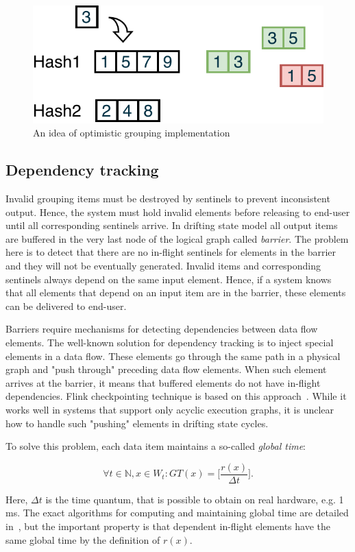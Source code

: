 \begin{figure}[htbp]
  \centering
  \includegraphics[width=.35\textwidth]{pics/grouping-invalidation}
  \caption{An idea of optimistic grouping implementation}
  \label {optimistic-grouping}
\end{figure} 

\subsection{Dependency tracking}

Invalid grouping items must be destroyed by sentinels to prevent inconsistent output. Hence, the system must hold invalid elements before releasing to end-user until all corresponding sentinels arrive. In drifting state model all output items are buffered in the very last node of the logical graph called {\em barrier}. The problem here is to detect that there are no in-flight sentinels for elements in the barrier and they will not be eventually generated. Invalid items and corresponding sentinels always depend on the same input element. Hence, if a system knows that all elements that depend on an input item are in the barrier, these elements can be delivered to end-user. 

Barriers require mechanisms for detecting dependencies between data flow elements. The well-known solution for dependency tracking is to inject special elements in a data flow. These elements go through the same path in a physical graph and "push through" preceding data flow elements. When such element arrives at the barrier, it means that buffered elements do not have in-flight dependencies. Flink checkpointing technique is based on this approach~\cite{Carbone:2017:SMA:3137765.3137777}. While it works well in systems that support only acyclic execution graphs, it is unclear how to handle such "pushing" elements in drifting state cycles. 

To solve this problem, each data item maintains a so-called {\em global time}: 

$$\forall{t\in{\mathbb{N}}, x\in{W_t}} : GT(x)=\Big[\frac{r(x)}{\Delta t}\Big].$$ 

Here, $\Delta t$ is the time quantum, that is possible to obtain on real hardware, e.g. 1 ms. The exact algorithms for computing and maintaining global time are detailed in~\cite{we2018adbis}, but the important property is that dependent in-flight elements have the same global time by the definition of $r(x)$. 

